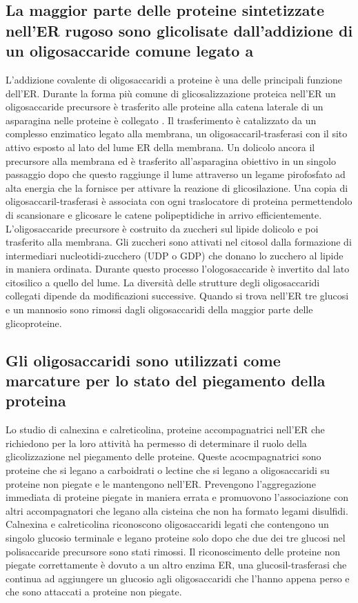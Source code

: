 \subsection{La maggior parte delle proteine sintetizzate nell'ER rugoso sono glicolisate dall'addizione di un oligosaccaride comune legato a }
L'addizione covalente di oligosaccaridi a proteine \`e una delle principali funzione dell'ER. Durante la forma pi\`u comune di glicosalizzazione proteica nell'ER un oligosaccaride 
precursore \`e trasferito alle proteine alla catena laterale  di un asparagina nelle proteine \`e collegato . Il trasferimento \`e catalizzato da un complesso enzimatico
legato alla membrana, un oligosaccaril-trasferasi con il sito attivo esposto al lato del lume ER della membrana. Un dolicolo ancora il precursore alla membrana ed \`e trasferito 
all'asparagina obiettivo in un singolo passaggio dopo che questo raggiunge il lume attraverso un legame pirofosfato ad alta energia che la fornisce per attivare la reazione di 
glicosilazione. Una copia di oligosaccaril-trasferasi \`e associata con ogni traslocatore di proteina permettendolo di scansionare e glicosare le catene polipeptidiche in arrivo 
efficientemente. L'oligosaccaride precursore \`e costruito da zuccheri sul lipide dolicolo e poi trasferito alla membrana. Gli zuccheri sono attivati nel citosol dalla formazione di
intermediari nucleotidi-zucchero (UDP o GDP) che donano lo zucchero al lipide in maniera ordinata. Durante questo processo l'ologosaccaride \`e invertito dal lato citosilico a quello
del lume. La diversit\`a delle strutture degli oligosaccaridi collegati  dipende da modificazioni successive. Quando si trova nell'ER tre glucosi e un mannosio sono rimossi
dagli oligosaccaridi della maggior parte delle glicoproteine. 
\subsection{Gli oligosaccaridi sono utilizzati come marcature per lo stato del piegamento della proteina}
Lo studio di calnexina e calreticolina, proteine accompagnatrici nell'ER che richiedono  per la loro attivit\`a ha permesso di determinare il ruolo della glicolizzazione 
nel piegamento delle proteine. Queste acocmpagnatrici sono proteine che si legano a carboidrati o lectine che si legano a oligosaccaridi su proteine non piegate e le mantengono nell'ER.
Prevengono l'aggregazione immediata di proteine piegate in maniera errata e promuovono l'associazione con altri accompagnatori che legano alla cisteina che non ha formato legami 
disulfidi. Calnexina e calreticolina riconoscono oligosaccaridi legati  che contengono un singolo glucosio terminale e legano proteine solo dopo che due dei tre glucosi nel 
polisaccaride precursore sono stati rimossi. Il riconoscimento delle proteine non piegate correttamente \`e dovuto a un altro enzima ER, una glucosil-trasferasi che continua ad 
aggiungere un glucosio agli oligosaccaridi che l'hanno appena perso e che sono attaccati a proteine non piegate. 
